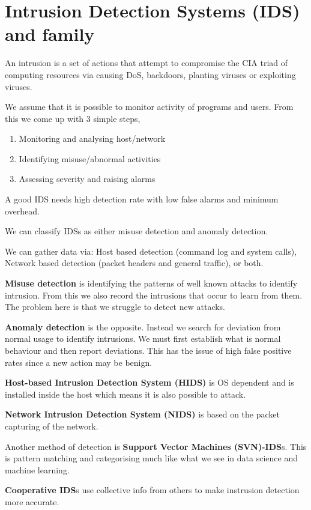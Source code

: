 \documentclass{report}
\begin{document}
\section{Intrusion Detection Systems (IDS) and family}
An intrusion is a set of actions that attempt to compromise the CIA triad
of computing resources via causing DoS, backdoors, planting viruses or
exploiting viruses.

We assume that it is possible to monitor activity of programs and users.
From this we come up with 3 simple steps,
\begin{enumerate}
    \item Monitoring and analysing host/network
    \item Identifying misuse/abnormal activities
    \item Assessing severity and raising alarms
\end{enumerate}

A good IDS needs high detection rate with low false alarms and minimum
overhead.

We can classify IDSs as either misuse detection and anomaly detection.

We can gather data via: Host based detection (command log and system calls),
Network based detection (packet headers and general traffic),
or both.

\textbf{Misuse detection}
is identifying the patterns of well known attacks to identify
intrusion. From this we also record the intrusions that occur to learn from
them. The problem here is that we struggle to detect new attacks.

\textbf{Anomaly detection}
is the opposite. Instead we search for deviation from normal usage to identify
intrusions. We must first establish what is normal behaviour and then report
deviations. This has the issue of high false positive rates since a new action
may be benign.

\textbf{Host-based Intrusion Detection System (HIDS)} is OS dependent and is
installed inside the host which means it is also possible to attack.

\textbf{Network Intrusion Detection System (NIDS)} is based on the packet
capturing of the network.

Another method of detection is \textbf{Support Vector Machines (SVN)-IDS}s.
This is pattern matching and categorising much like what we see in data science
and machine learning.

\textbf{Cooperative IDS}s use collective info from others to make instrusion
detection more accurate.
\end{document}
